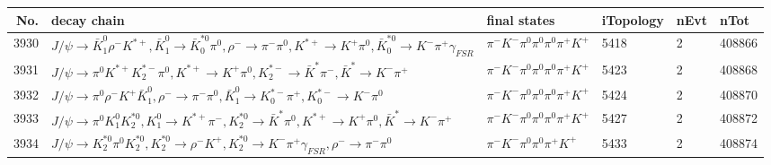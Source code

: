 \begin{table}[htbp] 
\begin{center}
\begin{small}
\begin{tabular}{rlllll}\hline\hline
 No. & decay chain & final states &  iTopology & nEvt & nTot \\\hline
3930&$J/\psi       \rightarrow \bar{K}_1^{0} \rho^{-}      K^{*+}         , \bar{K}_1^{0}  \rightarrow \bar{K}_0^{*0}\pi^{0}        , \rho^{-}       \rightarrow \pi^{-}        \pi^{0}        , K^{*+}          \rightarrow K^{+}          \pi^{0}        , \bar{K}_0^{*0} \rightarrow K^{-}          \pi^{+}        \gamma_{FSR} $&$\pi^{-}        K^{-}          \pi^{0}        \pi^{0}        \pi^{0}        \pi^{+}        K^{+}          $& 5418&    2&408866\\
3931&$J/\psi       \rightarrow \pi^{0}        K^{*+}         K_2^{*-}       \pi^{0}        , K^{*+}          \rightarrow K^{+}          \pi^{0}        , K_2^{*-}        \rightarrow \bar{K}^{*}   \pi^{-}        , \bar{K}^{*}    \rightarrow K^{-}          \pi^{+}        $&$\pi^{-}        K^{-}          \pi^{0}        \pi^{0}        \pi^{0}        \pi^{+}        K^{+}          $& 5423&    2&408868\\
3932&$J/\psi       \rightarrow \pi^{0}        \rho^{-}      K^{+}          \bar{K}_1^{0} , \rho^{-}       \rightarrow \pi^{-}        \pi^{0}        , \bar{K}_1^{0}  \rightarrow K_{0}^{*-}     \pi^{+}        , K_{0}^{*-}      \rightarrow K^{-}          \pi^{0}        $&$\pi^{-}        K^{-}          \pi^{0}        \pi^{0}        \pi^{0}        \pi^{+}        K^{+}          $& 5424&    2&408870\\
3933&$J/\psi       \rightarrow \pi^{0}        K_1^{0}        K_2^{*0}       , K_1^{0}         \rightarrow K^{*+}         \pi^{-}        , K_2^{*0}        \rightarrow \bar{K}^{*}   \pi^{0}        , K^{*+}          \rightarrow K^{+}          \pi^{0}        , \bar{K}^{*}    \rightarrow K^{-}          \pi^{+}        $&$\pi^{-}        K^{-}          \pi^{0}        \pi^{0}        \pi^{0}        \pi^{+}        K^{+}          $& 5427&    2&408872\\
3934&$J/\psi       \rightarrow K_2^{*0}       \pi^{0}        K_2^{*0}       , K_2^{*0}        \rightarrow \rho^{-}      K^{+}          , K_2^{*0}        \rightarrow K^{-}          \pi^{+}        \gamma_{FSR} , \rho^{-}       \rightarrow \pi^{-}        \pi^{0}        $&$\pi^{-}        K^{-}          \pi^{0}        \pi^{0}        \pi^{+}        K^{+}          $& 5433&    2&408874\\

\end{tabular}
\end{small}
\end{center}
\end{table}
